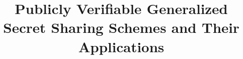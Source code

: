 \documentclass[runningheads]{llncs}
\begin{document}
\title{Publicly Verifiable Generalized Secret Sharing Schemes and Their Applications}

\maketitle

\begin{abstract}

\end{abstract}
\end{document}
